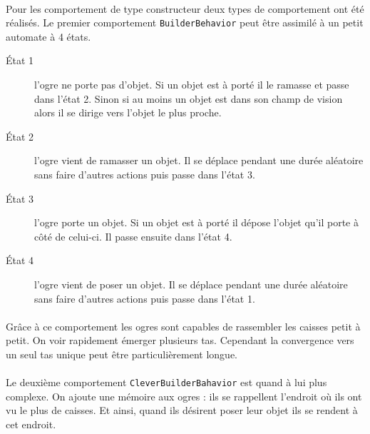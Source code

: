 \paragraph{}Pour les comportement de type constructeur deux types de comportement ont été
réalisés. Le premier comportement \texttt{BuilderBehavior} peut être assimilé à un petit automate à 4 états.


\begin{description}
    \item[\'Etat 1] l'ogre ne porte pas d'objet. Si un objet est à porté il
        le ramasse et passe dans l'état 2. Sinon si au moins un objet est dans son
        champ de vision alors il se dirige vers l'objet le plus proche.
    \item[\'Etat 2] l'ogre vient de ramasser un objet. Il se déplace pendant une
        durée aléatoire sans faire d'autres actions puis passe dans l'état 3.
    \item[\'Etat 3] l'ogre porte un objet. Si un objet est à porté il
        dépose l'objet qu'il porte à côté de celui-ci. Il passe ensuite dans
        l'état 4.
    \item[\'Etat 4] l'ogre vient de poser un objet. Il se déplace pendant une
        durée aléatoire sans faire d'autres actions puis passe dans l'état 1.
\end{description}

\paragraph{}Grâce à ce comportement les ogres sont capables de rassembler les caisses
petit à petit. On voir rapidement émerger plusieurs tas. Cependant la
convergence vers un seul tas unique peut être particulièrement longue.

\paragraph{}Le deuxième comportement \texttt{CleverBuilderBahavior} est quand à lui plus
complexe. On ajoute une mémoire aux ogres : ils se rappellent l'endroit où ils ont vu le
plus de caisses. Et ainsi, quand ils désirent poser leur objet ils se rendent à
cet endroit.

